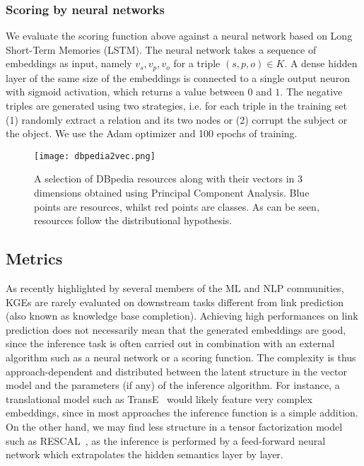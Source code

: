 \documentclass[graybox]{archivesofdatascience}
\begin{document}
\subsubsection{Scoring by neural networks}

We evaluate the scoring function above against a neural network based on Long Short-Term Memories (LSTM).
The neural network takes a sequence of embeddings as input, namely $v_s, v_p, v_o$ for a triple $(s,p,o) \in K$.
A dense hidden layer of the same size of the embeddings is connected to a single output neuron with sigmoid activation, which returns a value between $0$ and $1$.
The negative triples are generated using two strategies, i.e. for each triple in the training set (1) randomly extract a relation and its two nodes or (2) corrupt the subject or the object.
We use the Adam optimizer and 100 epochs of training.

\begin{figure}[t]
    \sidecaption
\texttt{[image: dbpedia2vec.png]}
    \caption{A selection of DBpedia resources along with their vectors in 3 dimensions obtained using Principal Component Analysis. Blue points are resources, whilst red points are classes. As can be seen, resources follow the distributional hypothesis.}
    \label{fig:dbpedia2vec}
\end{figure}

\subsection{Metrics}

As recently highlighted by several members of the ML and NLP communities, KGEs are rarely evaluated on downstream tasks different from link prediction (also known as knowledge base completion).
Achieving high performances on link prediction does not necessarily mean that the generated embeddings are good, since the inference task is often carried out in combination with an external algorithm such as a neural network or a scoring function.
The complexity is thus approach-dependent and distributed between the latent structure in the vector model and the parameters (if any) of the inference algorithm.
For instance, a translational model such as TransE~\cite{TransE/bordes2013translating} would likely feature very complex embeddings, since in most approaches the inference function is a simple addition.
On the other hand, we may find less structure in a tensor factorization model such as RESCAL~\cite{nickel2011three}, as the inference is performed by a feed-forward neural network which extrapolates the hidden semantics layer by layer.
\end{document}

